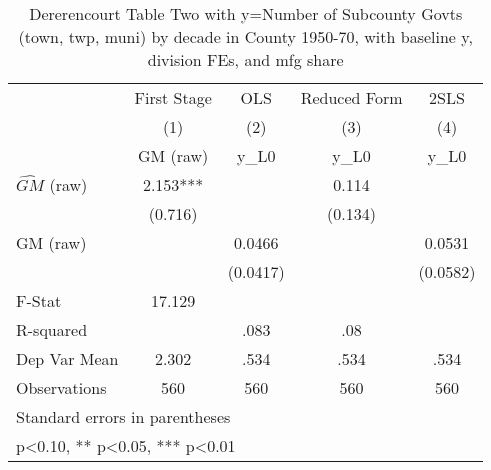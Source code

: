 \begin{table}[htbp]\centering
\def\sym#1{\ifmmode^{#1}\else\(^{#1}\)\fi}
\caption{Dererencourt Table Two with y=Number of Subcounty Govts (town, twp, muni) by decade in County 1950-70, with baseline y, division FEs, and mfg share}
\begin{tabular}{l*{4}{c}}
\toprule
                    & First Stage   &         OLS   &Reduced Form   &        2SLS   \\
                    &\multicolumn{1}{c}{(1)}&\multicolumn{1}{c}{(2)}&\multicolumn{1}{c}{(3)}&\multicolumn{1}{c}{(4)}\\
                    &\multicolumn{1}{c}{GM  (raw)}&\multicolumn{1}{c}{y\_L0}&\multicolumn{1}{c}{y\_L0}&\multicolumn{1}{c}{y\_L0}\\
\midrule
$\hat{GM}$ (raw)    &       2.153***&               &       0.114   &               \\
                    &     (0.716)   &               &     (0.134)   &               \\
\addlinespace
GM  (raw)           &               &      0.0466   &               &      0.0531   \\
                    &               &    (0.0417)   &               &    (0.0582)   \\
\midrule
F-Stat              &      17.129   &               &               &               \\
R-squared           &               &        .083   &         .08   &               \\
Dep Var Mean        &       2.302   &        .534   &        .534   &        .534   \\
Observations        &         560   &         560   &         560   &         560   \\
\bottomrule
\multicolumn{5}{l}{\footnotesize Standard errors in parentheses}\\
\multicolumn{5}{l}{\footnotesize * p<0.10, ** p<0.05, *** p<0.01}\\
\end{tabular}
\end{table}

